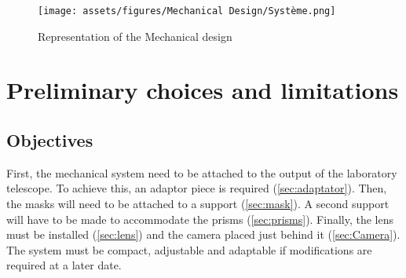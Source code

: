 \begin{figure}[H]
    \centering
    \texttt{[image: assets/figures/Mechanical Design/Système.png]}
    \caption{Representation of the Mechanical design}
    \label{fig:Mec_Blobal}
\end{figure}
\newpage
\section{Preliminary choices and limitations}
\subsection{Objectives}
First, the mechanical system need to be attached to the output of the laboratory telescope. To achieve this, an adaptor piece is
required (\ref{sec:adaptator}). Then, the masks will need to be attached to a support (\ref{sec:mask}). A second support will have
to be made to accommodate the prisms (\ref{sec:prisms}). Finally, the lens must be installed (\ref{sec:lens}) and the camera placed
just behind it (\ref{sec:Camera}). \newline
The system must be compact, adjustable and adaptable if modifications are required at a later date.
